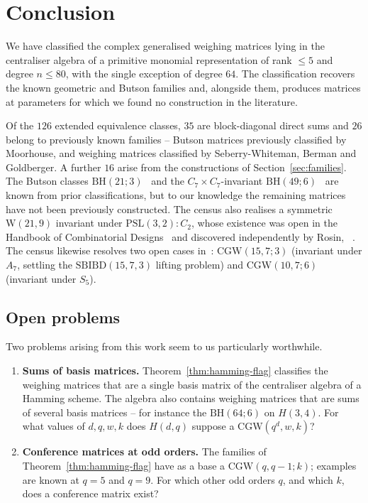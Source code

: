 \documentclass{article}
\theoremstyle{definition}
\theoremstyle{remark}
\newcommand{\CGW}{\mathrm{CGW}}
\newcommand{\BH}{\mathrm{BH}}
\newcommand{\We}{\mathrm{W}}
\begin{document}
\section{Conclusion}\label{sec:discussion}

We have classified the complex generalised weighing matrices lying in the centraliser algebra of a primitive monomial representation of rank $\leq 5$ and degree $n \leq 80$, with the single exception of degree $64$.  The classification recovers the known geometric and Butson families and, alongside them, produces matrices at parameters for which we found no construction in the literature.

Of the $126$ extended equivalence classes, $35$ are block-diagonal direct
sums and $26$ belong to previously known families -- Butson matrices previously classified by Moorhouse, and weighing matrices classified by Seberry-Whiteman, Berman and Goldberger. A further $16$ arise from the
constructions of Section~\ref{sec:families}. The Butson
classes $\BH(21;3)$~\cite{LOS2020} and the $C_7 \times C_7$-invariant
$\BH(49;6)$~\cite{Szollosi2012, SchmidtWongXiang2021} are known from prior classifications, but to our knowledge the remaining matrices have not been previously constructed. The census also realises a symmetric $\We(21,9)$ invariant
under $\mathrm{PSL}(3,2){:}C_2$, whose existence was open in the Handbook of
Combinatorial Designs~\cite{Handbook2007} and discovered independently by Rosin, ~\cite{Rosin2025}.  The census likewise resolves two open cases in~\cite{CGW-Survey}: $\CGW(15,7;3)$ (invariant under $A_7$, settling the
$\mathrm{SBIBD}(15,7,3)$ lifting problem) and $\CGW(10,7;6)$ (invariant
under $S_5$).

\subsection{Open problems}

Two problems arising from this work seem to us particularly worthwhile.

\begin{enumerate}
\item \textbf{Sums of basis matrices.}\label{prob:hamming-general}
Theorem~\ref{thm:hamming-flag} classifies the weighing matrices that are a
single basis matrix of the centraliser algebra of a Hamming scheme. The algebra
also contains weighing matrices that are sums of several basis matrices -- for
instance the $\BH(64;6)$ on $H(3,4)$. For what values of $d,q,w,k$ does $H(d,q)$ suppose a $\CGW(q^d, w,k)$?

\item \textbf{Conference matrices at odd orders.}\label{prob:conference-seeds}
The families of Theorem~\ref{thm:hamming-flag} have as a base a $\CGW(q,q-1;k)$; examples are known at $q=5$ and $q=9$. For which other odd orders $q$, and which $k$, does a conference matrix exist?
\end{enumerate}
\end{document}
